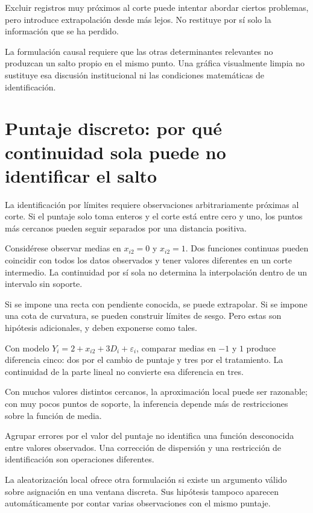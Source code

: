 \documentclass[11pt,a4paper]{article}
\begin{document}
Excluir registros muy próximos al corte
puede intentar abordar ciertos problemas,
pero introduce extrapolación desde más lejos.
No restituye por sí solo la información
que se ha perdido.

La formulación causal requiere que
las otras determinantes relevantes
no produzcan un salto propio en el mismo punto.
Una gráfica visualmente limpia
no sustituye esa discusión institucional
ni las condiciones matemáticas de identificación.

\clearpage
\section{Puntaje discreto: por qué continuidad sola puede no identificar el salto}\label{unidad40}
La identificación por límites requiere
observaciones arbitrariamente próximas al corte.
Si el puntaje solo toma enteros y
el corte está entre cero y uno,
los puntos más cercanos pueden
seguir separados por una distancia positiva.

Considérese observar medias en \(x_{i2}=0\)
y \(x_{i2}=1\).
Dos funciones continuas pueden coincidir
con todos los datos observados y tener
valores diferentes en un corte intermedio.
La continuidad por sí sola
no determina la interpolación dentro
de un intervalo sin soporte.

Si se impone una recta con pendiente conocida,
se puede extrapolar.
Si se impone una cota de curvatura,
se pueden construir límites de sesgo.
Pero estas son hipótesis adicionales,
y deben exponerse como tales.

\begin{ejemplo}
Con modelo
\(Y_i=2+x_{i2}+3D_i+\varepsilon_i\),
comparar medias en \(-1\) y \(1\)
produce diferencia cinco:
dos por el cambio de puntaje
y tres por el tratamiento.
La continuidad de la parte lineal
no convierte esa diferencia en tres.
\end{ejemplo}
Con muchos valores distintos cercanos,
la aproximación local puede ser razonable;
con muy pocos puntos de soporte,
la inferencia depende más de
restricciones sobre la función de media.

Agrupar errores por el valor del puntaje
no identifica una función desconocida
entre valores observados.
Una corrección de dispersión y una
restricción de identificación son
operaciones diferentes.

La aleatorización local ofrece otra
formulación si existe un argumento válido
sobre asignación en una ventana discreta.
Sus hipótesis tampoco aparecen automáticamente
por contar varias observaciones
con el mismo puntaje.
\end{document}
